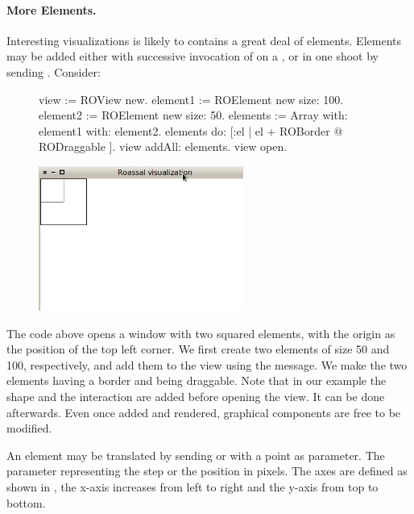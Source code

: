\documentclass[a4paper,10pt,twoside]{book}
\begin{document}
\paragraph{More Elements.}
Interesting visualizations is likely to contains a great deal of elements. Elements may be added either with successive invocation of  on a , or in one shoot by sending . Consider:

\begin{figure}[H]
      \begin{minipage}[t]{0.5\textwidth}
      \vspace{0pt}
\begin{code}{}
view := ROView new.
element1 := ROElement new size: 100.
element2 := ROElement new size: 50.
elements := Array with: element1 with: element2.
elements do: [:el | el + ROBorder @ RODraggable ].
view addAll: elements.
view open.
\end{code}
   \end{minipage}
   \hfill
   \begin{minipage}[t]{0.6\textwidth}
      \vspace{0pt} \raggedright
       \centering
		\includegraphics[width=0.6\textwidth]{ex3}
   \end{minipage}
\label{fig:ex3}
\end{figure}

The code above opens a window with two squared elements, with the origin as the position of the top left corner. We first create two elements of size 50 and 100, respectively, and add them to the view using the  message. We make the two elements having a border and being draggable. Note that in our example the shape and the interaction are added before opening the view. It can be done afterwards. Even once added and rendered, graphical components are free to be modified.

An element may be translated by sending  or  with a point as parameter. The parameter representing the step or the position in pixels. The axes are defined as shown in , the x-axis increases from left to right and the y-axis from top to bottom.
\end{document}
